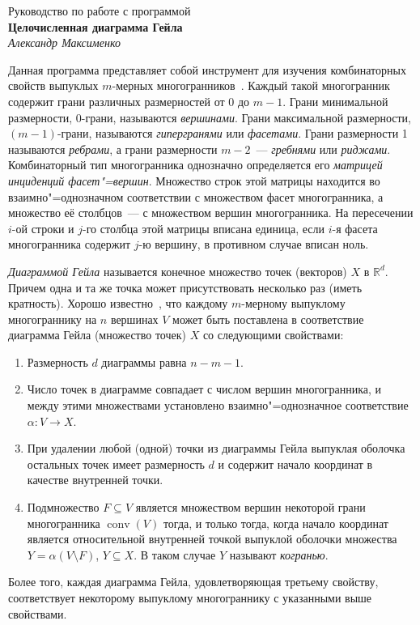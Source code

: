 \documentclass[12pt]{article}
\newcommand{\R}{\mathbb{R}}
\newcommand{\from}{\colon}
\DeclareMathOperator{\conv}{conv}
\begin{document}
\begin{center}
\large 
Руководство по работе с программой\\[0.5\baselineskip]
\textbf{Целочисленная диаграмма Гейла}\\[0.5\baselineskip]
\emph{Александр Максименко}\\
\end{center}


Данная программа представляет собой инструмент для изучения комбинаторных свойств выпуклых $m$-мерных многогранников~\cite{Grunbaum:2003, Ziegler:2014}.
Каждый такой многогранник содержит грани различных размерностей от 0 до $m-1$.
Грани минимальной размерности, 0-грани, называются \emph{вершинами}.
Грани максимальной размерности, $(m-1)$-грани,
называются \emph{гипергранями} или \emph{фасетами}.
Грани размерности 1 называются \emph{ребрами}, 
а грани размерности $m-2$~--- \emph{гребнями} или \emph{риджами}.
Комбинаторный тип многогранника однозначно определяется его \emph{матрицей инциденций фасет"=вершин}. 
Множество строк этой матрицы находится во взаимно"=однозначном соответствии с множеством фасет многогранника, а множество её столбцов~--- с множеством вершин многогранника.
На пересечении $i$-ой строки и $j$-го столбца этой матрицы вписана единица, 
если $i$-я фасета многогранника содержит $j$-ю вершину,
в противном случае вписан ноль.

\emph{Диаграммой Гейла} называется конечное множество точек (векторов) $X$ в $\R^d$.
Причем одна и та же точка может присутствовать несколько раз (иметь кратность).
Хорошо известно~\cite{Grunbaum:2003, Ziegler:2014}, что каждому $m$-мерному выпуклому многограннику на $n$ вершинах $V$ может быть поставлена в соответствие диаграмма Гейла (множество точек) $X$ со следующими свойствами:
\begin{enumerate}
	\item Размерность $d$ диаграммы равна $n - m - 1$.
	\item Число точек в диаграмме совпадает с числом вершин многогранника, и между этими множествами установлено взаимно"=однозначное соответствие $\alpha\from V \to X$.
	\item При удалении любой (одной) точки из диаграммы Гейла выпуклая оболочка остальных точек имеет размерность $d$ и содержит начало координат в качестве внутренней точки. 
	\item Подмножество $F \subseteq V$ является множеством вершин некоторой грани многогранника $\conv(V)$ тогда, и только тогда, когда начало координат является относительной внутренней точкой выпуклой оболочки множества $Y = \alpha(V \setminus F)$, $Y \subseteq X$.
	В таком случае $Y$ называют \emph{когранью}.
\end{enumerate}
Более того, каждая диаграмма Гейла, удовлетворяющая третьему свойству, соответствует некоторому выпуклому многограннику с указанными выше свойствами.
\end{document}
